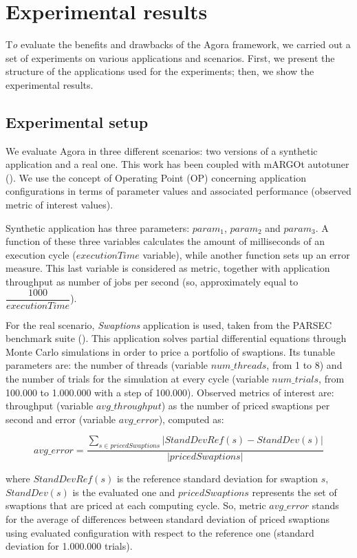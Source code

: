 \chapter{Experimental results}\label{exps}

\lettrine{T}{}\textit{o} evaluate the benefits and drawbacks of the Agora framework, we carried out a set of experiments on various applications and scenarios. First, we present the structure of the applications used for the experiments; then, we show the experimental results.

\section{Experimental setup}\label{expSetup}

We evaluate Agora in three different scenarios: two versions of a synthetic application and a real one. This work has been coupled with mARGOt autotuner (\cite{gadioli2015application}). We use the concept of Operating Point (OP) concerning application configurations in terms of parameter values and associated performance (observed metric of interest values).

Synthetic application has three parameters: $param_1$, $param_2$ and $param_3$. A function of these three variables calculates the amount of milliseconds of an execution cycle ($executionTime$ variable), while another function sets up an error measure. This last variable is considered as metric, together with application throughput as number of jobs per second (so, approximately equal to $\dfrac{1000}{executionTime}$).

For the real scenario, \textit{Swaptions} application is used, taken from the PARSEC benchmark suite (\cite{bienia2008parsec}). This application solves partial differential equations through Monte Carlo simulations in order to price a portfolio of swaptions. Its tunable parameters are: the number of threads (variable $num\_threads$, from 1 to 8) and the number of trials for the simulation at every cycle (variable $num\_trials$, from 100.000 to 1.000.000 with a step of 100.000). Observed metrics of interest are: throughput (variable $avg\_throughput$) as the number of priced swaptions per second and error (variable $avg\_error$), computed as:

\[
avg\_error = \dfrac{\sum_{s \in pricedSwaptions} \left\vert StandDevRef(s) - StandDev(s) \right\vert}{\left\vert pricedSwaptions \right\vert}
\]

where $StandDevRef(s)$ is the reference standard deviation for swaption $s$, $StandDev(s)$ is the evaluated one and $pricedSwaptions$ represents the set of swaptions that are priced at each computing cycle. So, metric $avg\_error$ stands for the average of differences between standard deviation of priced swaptions using evaluated configuration with respect to the reference one (standard deviation for 1.000.000 trials).

